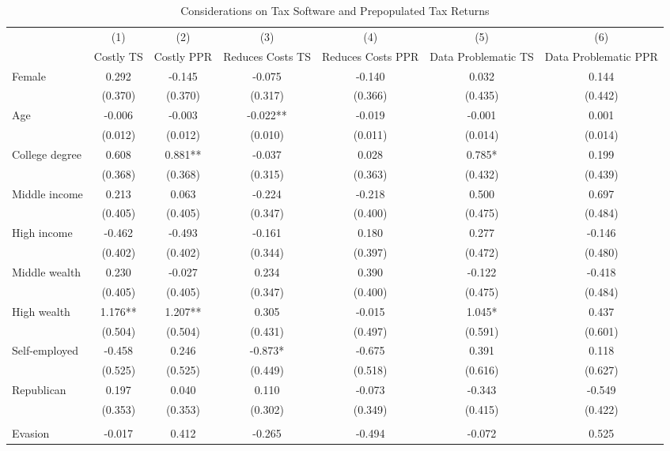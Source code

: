 \documentclass[11pt]{article}
\begin{document}
\begin{landscape}
\begin{table}[!htbp]\centering
\caption{Considerations on Tax Software and Prepopulated Tax Returns}
\label{tab:considerationsts_c}
\begin{threeparttable}
\footnotesize
\begin{tabular}{l|cccccc}
\toprule
& (1) & (2) & (3) & (4) & (5) & (6) \\
& Costly TS & Costly PPR & Reduces Costs TS & Reduces Costs PPR & Data Problematic TS & Data Problematic PPR \\
\midrule
Female & 0.292 & -0.145 & -0.075 & -0.140 & 0.032 & 0.144 \\
 & (0.370) & (0.370) & (0.317) & (0.366) & (0.435) & (0.442) \\
Age & -0.006 & -0.003 & -0.022** & -0.019 & -0.001 & 0.001 \\
 & (0.012) & (0.012) & (0.010) & (0.011) & (0.014) & (0.014) \\
College degree & 0.608 & 0.881** & -0.037 & 0.028 & 0.785* & 0.199 \\
 & (0.368) & (0.368) & (0.315) & (0.363) & (0.432) & (0.439) \\
Middle income & 0.213 & 0.063 & -0.224 & -0.218 & 0.500 & 0.697 \\
 & (0.405) & (0.405) & (0.347) & (0.400) & (0.475) & (0.484) \\
High income & -0.462 & -0.493 & -0.161 & 0.180 & 0.277 & -0.146 \\
 & (0.402) & (0.402) & (0.344) & (0.397) & (0.472) & (0.480) \\
Middle wealth & 0.230 & -0.027 & 0.234 & 0.390 & -0.122 & -0.418 \\
 & (0.405) & (0.405) & (0.347) & (0.400) & (0.475) & (0.484) \\
High wealth & 1.176** & 1.207** & 0.305 & -0.015 & 1.045* & 0.437 \\
 & (0.504) & (0.504) & (0.431) & (0.497) & (0.591) & (0.601) \\
Self-employed & -0.458 & 0.246 & -0.873* & -0.675 & 0.391 & 0.118 \\
 & (0.525) & (0.525) & (0.449) & (0.518) & (0.616) & (0.627) \\
Republican & 0.197 & 0.040 & 0.110 & -0.073 & -0.343 & -0.549 \\
 & (0.353) & (0.353) & (0.302) & (0.349) & (0.415) & (0.422) \\
\\[0.5em]
Evasion & -0.017 & 0.412 & -0.265 & -0.494 & -0.072 & 0.525 \\

\end{tabular}
\end{threeparttable}
\end{table}
\end{landscape}
\end{document}
